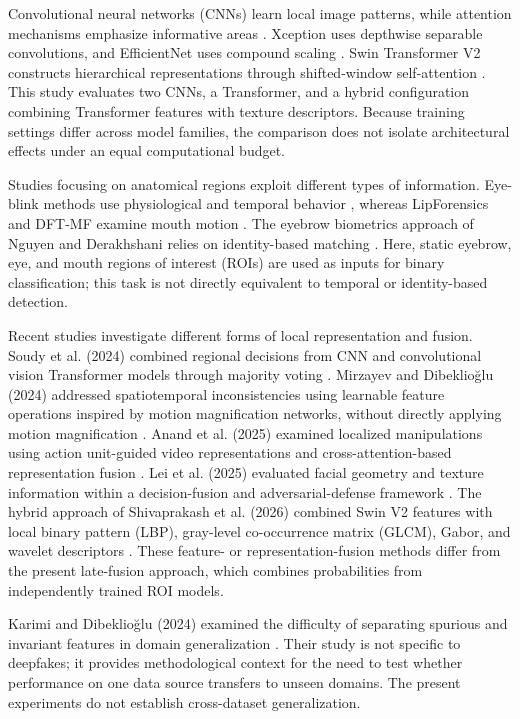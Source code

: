 \documentclass[a4paper]{elektr}
\begin{document}
Convolutional neural networks (CNNs) learn local image patterns, while attention mechanisms emphasize informative areas \cite{zhao}. Xception uses depthwise separable convolutions, and EfficientNet uses compound scaling \cite{chollet,tan}. Swin Transformer V2 constructs hierarchical representations through shifted-window self-attention \cite{swin}. This study evaluates two CNNs, a Transformer, and a hybrid configuration combining Transformer features with texture descriptors. Because training settings differ across model families, the comparison does not isolate architectural effects under an equal computational budget.

Studies focusing on anatomical regions exploit different types of information. Eye-blink methods use physiological and temporal behavior \cite{li,jung}, whereas LipForensics and DFT-MF examine mouth motion \cite{haliassos,elhassan}. The eyebrow biometrics approach of Nguyen and Derakhshani relies on identity-based matching \cite{nguyen}. Here, static eyebrow, eye, and mouth regions of interest (ROIs) are used as inputs for binary classification; this task is not directly equivalent to temporal or identity-based detection.

Recent studies investigate different forms of local representation and fusion. Soudy et al. (2024) combined regional decisions from CNN and convolutional vision Transformer models through majority voting \cite{soudy}. Mirzayev and Dibeklioğlu (2024) addressed spatiotemporal inconsistencies using learnable feature operations inspired by motion magnification networks, without directly applying motion magnification \cite{mirzayev}. Anand et al. (2025) examined localized manipulations using action unit-guided video representations and cross-attention-based representation fusion \cite{anand}. Lei et al. (2025) evaluated facial geometry and texture information within a decision-fusion and adversarial-defense framework \cite{lei}. The hybrid approach of Shivaprakash et al. (2026) combined Swin V2 features with local binary pattern (LBP), gray-level co-occurrence matrix (GLCM), Gabor, and wavelet descriptors \cite{shivaprakash}. These feature- or representation-fusion methods differ from the present late-fusion approach, which combines probabilities from independently trained ROI models.

Karimi and Dibeklioğlu (2024) examined the difficulty of separating spurious and invariant features in domain generalization \cite{karimi}. Their study is not specific to deepfakes; it provides methodological context for the need to test whether performance on one data source transfers to unseen domains. The present experiments do not establish cross-dataset generalization.
\end{document}

